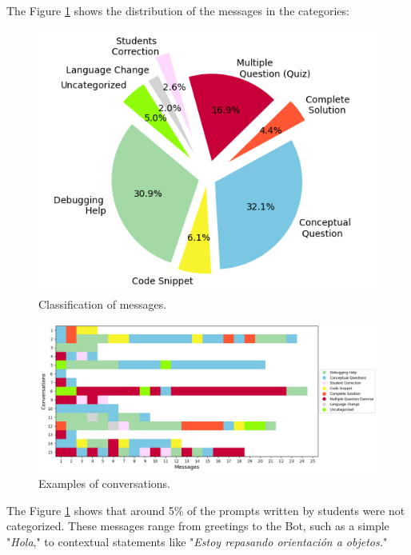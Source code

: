 \documentclass[a4paper,twoside]{article}
\begin{document}
The Figure \ref{fig:graph1} shows the distribution of the messages in the
categories:

\begin{figure}[h!]
    \centering
    \includegraphics[scale=0.62]{img/figure1.png}
    \caption{Classification of messages.}
    \label{fig:graph1}
\end{figure}

\begin{figure}[htbp]
  \centering
  \includegraphics[scale=0.52]{img/figure2.png}
  \caption{Examples of conversations.}
  \label{fig:graph2}
\end{figure}



The Figure \ref{fig:graph1} shows that around 5\% of the prompts
written by students were not categorized. These messages range from
greetings to the Bot, such as a simple "\textit{Hola}," to
contextual statements like "\textit{Estoy repasando orientación a
objetos.}"
\end{document}
